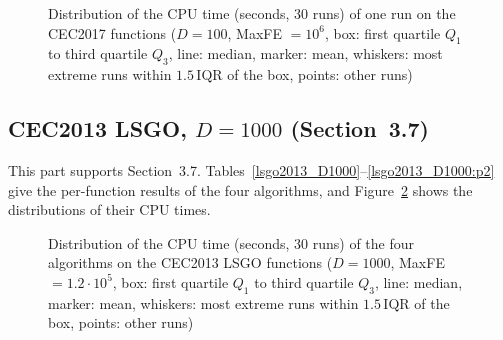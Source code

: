 \begin{figure}[!htbp]
    \centering
    \caption{Distribution of the CPU time (seconds, 30 runs) of one run on the CEC2017 functions ($D=100$, MaxFE $=10^6$, box: first quartile $Q_1$ to third quartile $Q_3$, line: median, marker: mean, whiskers: most extreme runs within $1.5\,\mathrm{IQR}$ of the box, points: other runs)}
    \label{fig:time_100D}
\end{figure}




\FloatBarrier
\subsection{CEC2013 LSGO, $D=1000$ (Section~3.7)}\label{app:lsgo}
This part supports Section~3.7. Tables~\ref{lsgo2013_D1000}--\ref{lsgo2013_D1000:p2} give the per-function results of the four algorithms, and Figure~\ref{fig:time_lsgo} shows the distributions of their CPU times.


\begin{figure}[!htbp]
    \centering
    \caption{Distribution of the CPU time (seconds, 30 runs) of the four algorithms on the CEC2013 LSGO functions ($D=1000$, MaxFE $=1.2\cdot10^5$, box: first quartile $Q_1$ to third quartile $Q_3$, line: median, marker: mean, whiskers: most extreme runs within $1.5\,\mathrm{IQR}$ of the box, points: other runs)}
    \label{fig:time_lsgo}
\end{figure}




\FloatBarrier


